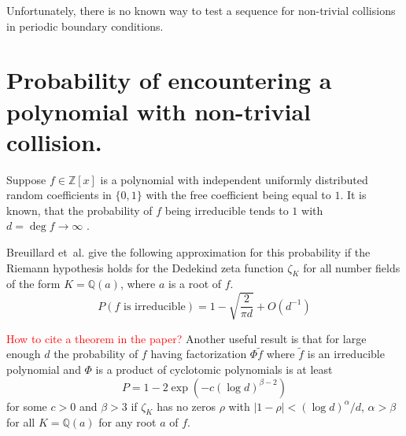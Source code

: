 \documentclass[12pt, a4paper]{article}
\begin{document}
Unfortunately, there is no known way to test a sequence for non-trivial
collisions in periodic boundary conditions.

\section{Probability of encountering a polynomial with non-trivial collision.}

Suppose $f \in \mathbb{Z}[x]$ is a polynomial with independent uniformly
distributed random coefficients in $\{0, 1\}$ with the free coefficient being
equal to $1$. It is known, that the probability of $f$ being irreducible tends
to $1$ with $d = \deg f \to \infty$ \cite{konyagin1999number}.

Breuillard et~al. \cite{breuillard2019irreducibility} give the following
approximation for this probability if the Riemann hypothesis holds for the
Dedekind zeta function $\zeta_K$ for all number fields of the form
$K = \mathbb{Q}(a)$, where $a$ is a root of $f$.
\begin{equation}
  P(\text{$f$ is irreducible}) = 1 - \sqrt{\frac{2}{\pi d}} + O(d^{-1})
  \label{eq:prob-irr}
\end{equation}

\textcolor{red}{How to cite a theorem in the paper?}
Another useful result is that for large enough $d$ the probability
of $f$ having factorization $\Phi \tilde{f}$ where $\tilde{f}$ is an irreducible
polynomial and $\Phi$ is a product of cyclotomic polynomials is at least
\begin{equation}
  P = 1 - 2\exp(-c(\log d)^{\beta - 2})
  \label{eq:prob-cyc-1}
\end{equation}
for some $c > 0$ and $\beta > 3$ if $\zeta_K$ has no zeros $\rho$ with
$|1 - \rho| < (\log d)^\alpha/d$, $\alpha > \beta$ for all $K = \mathbb{Q}(a)$
for any root $a$ of $f$.
\end{document}
